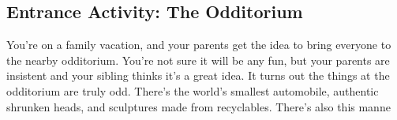 \subsection{Entrance Activity: The Odditorium}
You're on a family vacation, and your parents get the idea to bring everyone to the nearby odditorium. You're not sure it will be any fun, but your parents are insistent and your sibling thinks it's a great idea. It turns out the things at the odditorium are truly odd. There's the world's smallest automobile, authentic shrunken heads, and sculptures made from recyclables. There's also this manne
